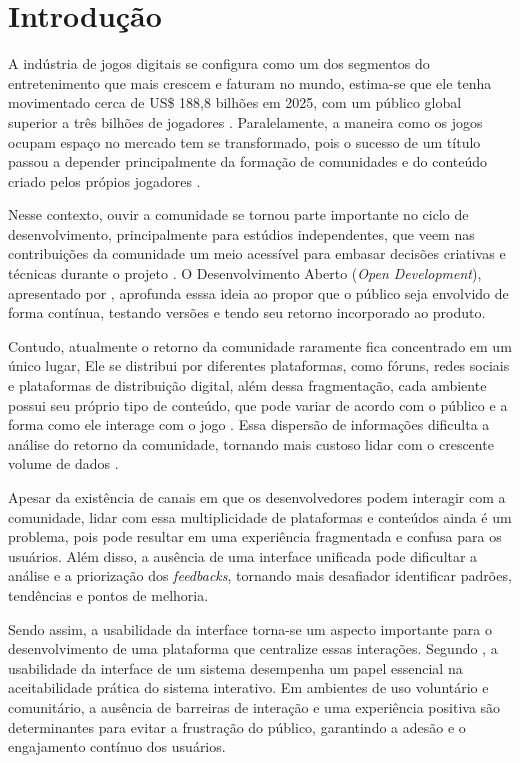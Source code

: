 \chapter{Introdução} \label{cha:introducao}

A indústria de jogos digitais se configura como um dos segmentos do entretenimento que mais crescem e faturam no mundo, estima-se que ele tenha movimentado cerca de US\$ 188,8 bilhões em 2025, com um público global superior a três bilhões de jogadores \cite{newzoo2025}. Paralelamente, a maneira como os jogos ocupam espaço no mercado tem se transformado, pois o sucesso de um título passou a depender principalmente da formação de comunidades e do conteúdo criado pelos própios jogadores \cite{bain2025}.

Nesse contexto, ouvir a comunidade se tornou parte importante no ciclo de desenvolvimento, principalmente para estúdios independentes, que veem nas contribuições da comunidade um meio acessível para embasar decisões criativas e técnicas durante o projeto \cite{uchoa2018}. O Desenvolvimento Aberto (\textit{Open Development}), apresentado por , aprofunda esssa ideia ao propor que o público seja envolvido de forma contínua, testando versões e tendo seu retorno incorporado ao produto.

Contudo, atualmente o retorno da comunidade raramente fica concentrado em um único lugar, Ele se distribui por diferentes plataformas, como fóruns, redes sociais e plataformas de distribuição digital, além dessa fragmentação, cada ambiente possui seu próprio tipo de conteúdo, que pode variar de acordo com o público e a forma como ele interage com o jogo \cite{tong2022}. Essa dispersão de informações dificulta a análise do retorno da comunidade, tornando mais custoso lidar com o crescente volume de dados \cite{xiao2025}. 

Apesar da existência de canais em que os desenvolvedores podem interagir com a comunidade, lidar com essa multiplicidade de plataformas e conteúdos ainda é um problema, pois pode resultar em uma experiência fragmentada e confusa para os usuários. Além disso, a ausência de uma interface unificada pode dificultar a análise e a priorização dos \textit{feedbacks}, tornando mais desafiador identificar padrões, tendências e pontos de melhoria.

Sendo assim, a usabilidade da interface torna-se um aspecto importante para o desenvolvimento de uma plataforma que centralize essas interações. Segundo , a usabilidade da interface de um sistema desempenha um papel essencial na aceitabilidade prática do sistema interativo. Em ambientes de uso voluntário e comunitário, a ausência de barreiras de interação e uma experiência positiva são determinantes para evitar a frustração do público, garantindo a adesão e o engajamento contínuo dos usuários.


